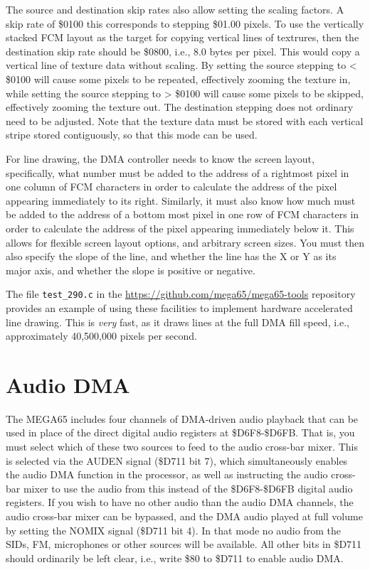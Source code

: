 The source and destination
skip rates also allow setting the scaling factors.  A skip rate of \$0100 this corresponds to stepping \$01.00 pixels.
To use the vertically stacked FCM layout as the target for copying vertical lines of textrures, then the destination
skip rate should be \$0800, i.e., 8.0 bytes per pixel.  This would copy a vertical line of texture data without scaling.
By setting the source stepping to < \$0100 will cause some pixels to be repeated, effectively zooming the texture in,
while setting the source stepping to > \$0100 will cause some pixels to be skipped, effectively zooming the texture out.
The destination stepping does not ordinary need to be adjusted.  Note that the texture data must be stored with each
vertical stripe stored contiguously, so that this mode can be used.

For line drawing, the DMA controller needs to know the screen layout, specifically, what number must be added to the
address of a rightmost pixel in one column of FCM characters in order to calculate the address of the pixel appearing
immediately to its right. Similarly, it must also know how much must be added to the address of a bottom most pixel in
one row of FCM characters in order to calculate the address of the pixel appearing immediately below it.  This allows
for flexible screen layout options, and arbitrary screen sizes.  You must then also specify the slope of the line, and
whether the line has the X or Y as its major axis, and whether the slope is positive or negative.

The file {\tt test\_290.c}
in the \url{https://github.com/mega65/mega65-tools} repository provides an example of using these facilities to
implement hardware accelerated line drawing. This is {\em very} fast, as it draws lines at the full DMA fill speed,
i.e., approximately 40,500,000 pixels per second.

\section{Audio DMA}
The MEGA65 includes four channels of DMA-driven audio playback that can be used in place of the direct digital
audio registers at \$D6F8-\$D6FB.  That is, you must select which of these two sources to feed to the audio
cross-bar mixer.  This is selected via the AUDEN signal (\$D711 bit 7), which simultaneously enables the audio DMA
function in the processor, as well as instructing the audio cross-bar mixer to use the audio from this instead
of the \$D6F8-\$D6FB digital audio registers. If you wish to have no
other audio than the audio DMA channels, the audio cross-bar mixer can
be bypassed, and the DMA audio played at full volume by setting the
NOMIX signal (\$D711 bit 4).  In that mode no audio from the SIDs, FM,
microphones or other sources will be available.
All other bits in
\$D711 should ordinarily be left clear, i.e., write \$80 to \$D711 to
enable audio DMA.

